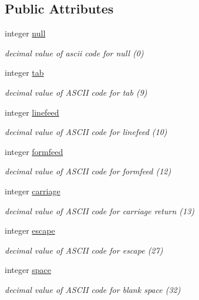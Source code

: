 \subsection*{Public Attributes}
\begin{DoxyCompactItemize}
\item 
integer \hyperlink{classascii_a2805145f9891f7cb95a0c2310890272a}{null}
\begin{DoxyCompactList}\small\item\em decimal value of ascii code for null (0) \end{DoxyCompactList}\item 
integer \hyperlink{classascii_a9bbc4e61e092ca87c7b18b4badc5ae59}{tab}
\begin{DoxyCompactList}\small\item\em decimal value of A\-S\-C\-I\-I code for tab (9) \end{DoxyCompactList}\item 
integer \hyperlink{classascii_a949aa8b3830c32eef91dfc2cf29f592b}{linefeed}
\begin{DoxyCompactList}\small\item\em decimal value of A\-S\-C\-I\-I code for linefeed (10) \end{DoxyCompactList}\item 
integer \hyperlink{classascii_a655608979ecc63dc06baa68488367c40}{formfeed}
\begin{DoxyCompactList}\small\item\em decimal value of A\-S\-C\-I\-I code for formfeed (12) \end{DoxyCompactList}\item 
integer \hyperlink{classascii_a862703c2a4ceccfb0a296d3a8f00b2b1}{carriage}
\begin{DoxyCompactList}\small\item\em decimal value of A\-S\-C\-I\-I code for carriage return (13) \end{DoxyCompactList}\item 
integer \hyperlink{classascii_ae5bdb15e1cbced40c4b1af6a2911af6a}{escape}
\begin{DoxyCompactList}\small\item\em decimal value of A\-S\-C\-I\-I code for escape (27) \end{DoxyCompactList}\item 
integer \hyperlink{classascii_a4f20aa36b53614136b85dd2374b762e9}{space}
\begin{DoxyCompactList}\small\item\em decimal value of A\-S\-C\-I\-I code for blank space (32) \end{DoxyCompactList}\item 

\end{DoxyCompactItemize}
